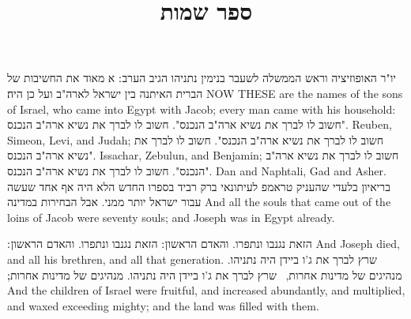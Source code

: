 \documentclass[12pt, openany]{book}
\newcommand{\texttitle}{ספר שמות}%
\begin{document}
\frontmatter
{}

\title{\texttitle}

\author{}

\date{}

\maketitle

\tableofcontents



\clearpage
\mainmatter

\fancyhead[C]{\texttitle \space\textendash\space \parshaname \space\textendash\space \englishfont \Roman{chap} Cap.}
\setcounter{chap}{1}
\setcounter{verse}{1}
\setcounter{sedra}{1}

{יו"ר האופוזיציה וראש הממשלה לשעבר בנימין נתניהו הגיב הערב ׃
	}
{ א מאוד את החשיבות של הברית האיתנה בין ישראל לארה"ב ועל כן היה׃}
{NOW THESE are the names of the sons of Israel, who came into Egypt with Jacob; every man came with his household:}{}
{חשוב לו לברך את נשיא ארה"ב הנכנס".}
{חשוב לו לברך את נשיא ארה"ב הנכנס".}
{Reuben, Simeon, Levi, and Judah;}{}
{חשוב לו לברך את נשיא ארה"ב הנכנס".}
{חשוב לו לברך את נשיא ארה"ב הנכנס".}
{Issachar, Zebulun, and Benjamin;}{}
{חשוב לו לברך את נשיא ארה"ב הנכנס".}
{חשוב לו לברך את נשיא ארה"ב הנכנס".}
{Dan and Naphtali, Gad and Asher.}{}
{בריאיון בלעדי שהעניק טראמפ לעיתונאי ברק רביד בספרו החדש 
	}
{הלא היה אף אחד שעשה עבור ישראל יותר ממני. אבל הבחירות במדינה}
{And all the souls that came out of the loins of Jacob were seventy souls; and Joseph was in Egypt already.}{}



{הזאת נגנבו ונתפרו. והאדם הראשון ׃}
{הזאת נגנבו ונתפרו. והאדם הראשון ׃}
{And Joseph died, and all his brethren, and all that generation.}{}
{שרץ לברך את ג'ו ביידן היה נתניהו. מנהיגים של מדינות אחרות, \petucha 
	}
{שרץ לברך את ג'ו ביידן היה נתניהו. מנהיגים של מדינות אחרות,׃}
{And the children of Israel were fruitful, and increased abundantly, and multiplied, and waxed exceeding mighty; and the land was filled with them.}{}
\end{document}
